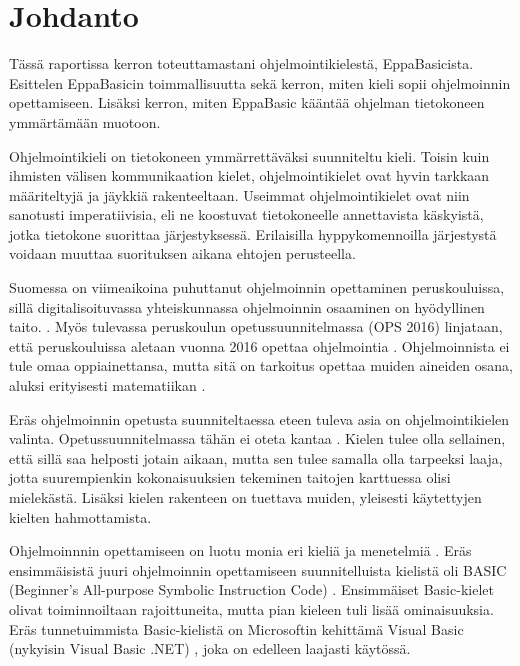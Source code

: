 
\section{Johdanto}
Tässä raportissa kerron toteuttamastani
ohjelmointikielestä, EppaBasicista.
Esittelen EppaBasicin toimmallisuutta
sekä kerron, miten kieli sopii
ohjelmoinnin opettamiseen.
Lisäksi kerron, miten EppaBasic
kääntää ohjelman tietokoneen
ymmärtämään muotoon.

Ohjelmointikieli on tietokoneen ymmärrettäväksi
suunniteltu kieli. Toisin kuin ihmisten välisen kommunikaation
kielet, ohjelmointikielet ovat hyvin tarkkaan määriteltyjä ja
jäykkiä rakenteeltaan. Useimmat ohjelmointikielet ovat niin
sanotusti imperatiivisia, eli ne koostuvat tietokoneelle
annettavista käskyistä, jotka tietokone suorittaa järjestyksessä.
Erilaisilla hyppykomennoilla järjestystä voidaan muuttaa suorituksen
aikana ehtojen perusteella.

Suomessa on viimeaikoina puhuttanut ohjelmoinnin
opettaminen peruskouluissa,
sillä digitalisoituvassa
yhteiskunnassa ohjelmoinnin
osaaminen on hyödyllinen taito.
\cite{hs_kiuru}\cite{hs_eka}.
Myös tulevassa peruskoulun
opetussuunnitelmassa (OPS 2016)
linjataan, että peruskouluissa aletaan
vuonna 2016 opettaa ohjelmointia
\cite{OPS_2016}.
Ohjelmoinnista ei tule omaa oppiainettansa,
mutta sitä on tarkoitus opettaa muiden
aineiden osana, aluksi erityisesti
matematiikan \cite{OPS_2016}\cite{hs_eka}.

Eräs ohjelmoinnin opetusta suunniteltaessa eteen tuleva
asia on ohjelmointikielen valinta.
Opetussuunnitelmassa tähän ei
oteta kantaa \cite{hs_eka}.
Kielen tulee olla sellainen,
että sillä saa helposti jotain aikaan,
mutta sen tulee samalla olla tarpeeksi laaja,
jotta suurempienkin kokonaisuuksien tekeminen
taitojen karttuessa olisi mielekästä.
Lisäksi kielen rakenteen on tuettava muiden,
yleisesti käytettyjen kielten hahmottamista.

Ohjelmoinnnin opettamiseen
on luotu monia eri kieliä ja menetelmiä
\cite{language_history}.
Eräs ensimmäisistä juuri ohjelmoinnin opettamiseen
suunnitelluista kielistä oli BASIC
(Beginner's All-purpose Symbolic Instruction Code)
\cite{basic}.
Ensimmäiset Basic-kielet olivat toiminnoiltaan rajoittuneita,
mutta pian kieleen tuli lisää ominaisuuksia.
Eräs tunnetuimmista Basic-kielistä on
Microsoftin kehittämä Visual Basic
(nykyisin Visual Basic .NET)
\cite{language_history},
joka on edelleen laajasti käytössä.

